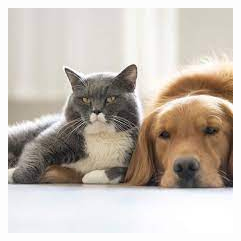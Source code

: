 \begin{figure}
\begin{minipage}{0.3\textwidth}
 \includegraphics[width=\textwidth]{Graphics/Images/image_9.jpg}
 \caption{ }
 \label{fig:9}
\end{minipage}
\end{figure}

